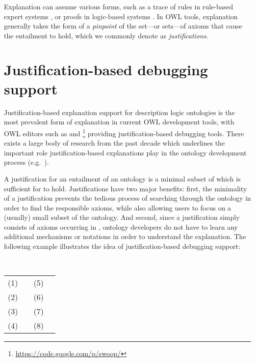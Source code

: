 Explanation can assume various forms, such as a trace of rules in rule-based expert systems \cite{buchanan84lq}, or proofs in logic-based systems \cite{borgida99cn,mcguinness96rp}. In OWL tools, explanation generally takes the form of a \emph{pinpoint} of the set---or sets---of axioms that cause the entailment to hold, which we commonly denote as \emph{justifications}. 

\section{Justification-based debugging support}

Justification-based explanation support for description logic ontologies is the most prevalent form of explanation in current OWL development tools, with OWL editors such as \protege and \swoop\footnote{\url{https://code.google.com/p/swoop/}} providing justification-based debugging tools. There exists a large body of research from the past decade which underlines the important role justification-based explanations play in the ontology development process (e.g.\ \cite{schlobach03nc,kalyanpur05mi,lam07aa,horridge08yi}).

A justification \just for an entailment \ent of an ontology \ont is a minimal subset of \ont which is sufficient for \ent to hold. Justifications have two major benefits: first, the minimality of a justification prevents the tedious process of searching through the ontology in order to find the responsible axioms, while also allowing users to focus on a (usually) small subset of the ontology. And second, since a justification simply consists of axioms occurring in \ont, ontology developers do not have to learn any additional mechanisms or notations in order to understand the explanation. The following example illustrates the idea of justification-based debugging support:
\begin{examp}
~\newline ~\newline
\small
\begin{tabu}{rlrl}
		(1)& &(5)&\\
		(2)&& (6)&\\
		(3)&	&(7)&\\
		(4)& & (8)&
\end{tabu}
\end{examp}

